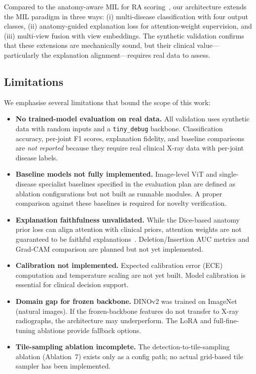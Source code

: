\documentclass{article}
\begin{document}
Compared to the anatomy-aware MIL for RA scoring~\cite{bo2025}, our architecture extends the MIL paradigm in three ways: (i) multi-disease classification with four output classes, (ii) anatomy-guided explanation loss for attention-weight supervision, and (iii) multi-view fusion with view embeddings. The synthetic validation confirms that these extensions are mechanically sound, but their clinical value---particularly the explanation alignment---requires real data to assess.

\subsection{Limitations}
\label{sec:limitations}

We emphasise several limitations that bound the scope of this work:

\begin{itemize}
  \item \textbf{No trained-model evaluation on real data.} All validation uses synthetic data with random inputs and a \texttt{tiny\_debug} backbone. Classification accuracy, per-joint F1 scores, explanation fidelity, and baseline comparisons are \emph{not reported} because they require real clinical X-ray data with per-joint disease labels.
  \item \textbf{Baseline models not fully implemented.} Image-level ViT and single-disease specialist baselines specified in the evaluation plan are defined as ablation configurations but not built as runnable modules. A proper comparison against these baselines is required for novelty verification.
  \item \textbf{Explanation faithfulness unvalidated.} While the Dice-based anatomy prior loss can align attention with clinical priors, attention weights are not guaranteed to be faithful explanations~\cite{jain2019attention}. Deletion/Insertion AUC metrics and Grad-CAM comparison are planned but not yet implemented.
  \item \textbf{Calibration not implemented.} Expected calibration error (ECE) computation and temperature scaling are not yet built. Model calibration is essential for clinical decision support.
  \item \textbf{Domain gap for frozen backbone.} DINOv2 was trained on ImageNet (natural images). If the frozen-backbone features do not transfer to X-ray radiographs, the architecture may underperform. The LoRA and full-fine-tuning ablations provide fallback options.
  \item \textbf{Tile-sampling ablation incomplete.} The detection-to-tile-sampling ablation (Ablation~7) exists only as a config path; no actual grid-based tile sampler has been implemented.
\end{itemize}
\end{document}
